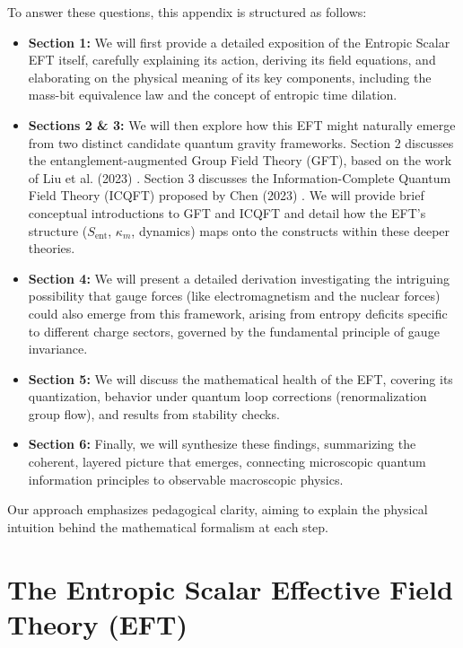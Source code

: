 \documentclass[11pt]{article}
\begin{document}
To answer these questions, this appendix is structured as follows:
\begin{itemize}
    \item \textbf{Section 1:} We will first provide a detailed exposition of the Entropic Scalar EFT itself, carefully explaining its action, deriving its field equations, and elaborating on the physical meaning of its key components, including the mass-bit equivalence law and the concept of entropic time dilation.
    \item \textbf{Sections 2 \& 3:} We will then explore how this EFT might naturally emerge from two distinct candidate quantum gravity frameworks. Section 2 discusses the entanglement-augmented Group Field Theory (GFT), based on the work of Liu et al. (2023) \cite{Liu2023}. Section 3 discusses the Information-Complete Quantum Field Theory (ICQFT) proposed by Chen (2023) \cite{Chen2023}. We will provide brief conceptual introductions to GFT and ICQFT and detail how the EFT's structure ($S_{\mathrm{ent}}$, $\kappa_m$, dynamics) maps onto the constructs within these deeper theories.
    \item \textbf{Section 4:} We will present a detailed derivation investigating the intriguing possibility that gauge forces (like electromagnetism and the nuclear forces) could also emerge from this framework, arising from entropy deficits specific to different charge sectors, governed by the fundamental principle of gauge invariance.
    \item \textbf{Section 5:} We will discuss the mathematical health of the EFT, covering its quantization, behavior under quantum loop corrections (renormalization group flow), and results from stability checks.
    \item \textbf{Section 6:} Finally, we will synthesize these findings, summarizing the coherent, layered picture that emerges, connecting microscopic quantum information principles to observable macroscopic physics.
\end{itemize}
Our approach emphasizes pedagogical clarity, aiming to explain the physical intuition behind the mathematical formalism at each step.

\section{The Entropic Scalar Effective Field Theory (EFT)}
\end{document}
